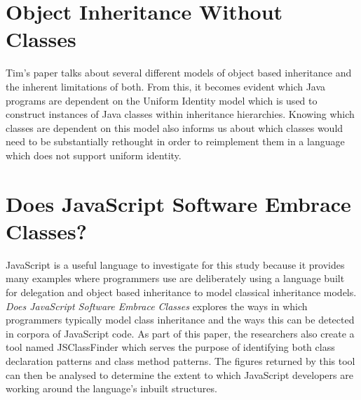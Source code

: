 \section{Object Inheritance Without Classes~\cite{InheritanceWithoutClasses}}
Tim's paper talks about several different models of object based inheritance and the inherent limitations of both. From this, it becomes evident which Java programs are dependent on the Uniform Identity model which is used to construct instances of Java classes within inheritance hierarchies. Knowing which classes are dependent on this model also informs us about which classes would need to be substantially rethought in order to reimplement them in a language which does not support uniform identity.

\section{Does JavaScript Software Embrace Classes?~\cite{JSClassFinder}}
JavaScript is a useful language to investigate for this study because it provides many examples where programmers use are deliberately using a language built for delegation and object based inheritance to model classical inheritance models. \textit{Does JavaScript Software Embrace Classes} explores the ways in which programmers typically model class inheritance and the ways this can be detected in corpora of JavaScript code. As part of this paper, the researchers also create a tool named JSClassFinder which serves the purpose of identifying both class declaration patterns and class method patterns. The figures returned by this tool can then be analysed to determine the extent to which JavaScript developers are working around the language's inbuilt structures.
